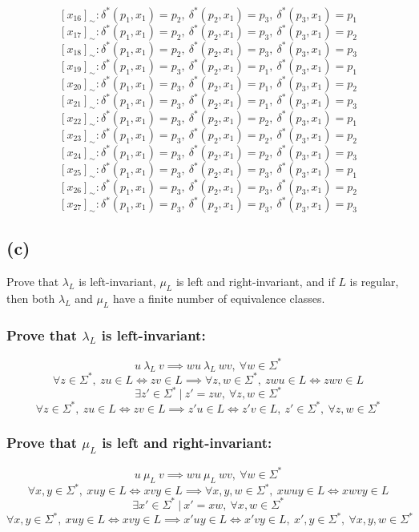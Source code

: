 \documentclass[12pt]{article}
\begin{document}
$$[x_{16}]_{\sim} : \delta^*(p_1, x_1) = p_2,\ \delta^*(p_2, x_1) = p_3,\ \delta^*(p_3, x_1) = p_1$$
$$[x_{17}]_{\sim} : \delta^*(p_1, x_1) = p_2,\ \delta^*(p_2, x_1) = p_3,\ \delta^*(p_3, x_1) = p_2$$
$$[x_{18}]_{\sim} : \delta^*(p_1, x_1) = p_2,\ \delta^*(p_2, x_1) = p_3,\ \delta^*(p_3, x_1) = p_3$$
$$[x_{19}]_{\sim} : \delta^*(p_1, x_1) = p_3,\ \delta^*(p_2, x_1) = p_1,\ \delta^*(p_3, x_1) = p_1$$
$$[x_{20}]_{\sim} : \delta^*(p_1, x_1) = p_3,\ \delta^*(p_2, x_1) = p_1,\ \delta^*(p_3, x_1) = p_2$$
$$[x_{21}]_{\sim} : \delta^*(p_1, x_1) = p_3,\ \delta^*(p_2, x_1) = p_1,\ \delta^*(p_3, x_1) = p_3$$
$$[x_{22}]_{\sim} : \delta^*(p_1, x_1) = p_3,\ \delta^*(p_2, x_1) = p_2,\ \delta^*(p_3, x_1) = p_1$$
$$[x_{23}]_{\sim} : \delta^*(p_1, x_1) = p_3,\ \delta^*(p_2, x_1) = p_2,\ \delta^*(p_3, x_1) = p_2$$
$$[x_{24}]_{\sim} : \delta^*(p_1, x_1) = p_3,\ \delta^*(p_2, x_1) = p_2,\ \delta^*(p_3, x_1) = p_3$$
$$[x_{25}]_{\sim} : \delta^*(p_1, x_1) = p_3,\ \delta^*(p_2, x_1) = p_3,\ \delta^*(p_3, x_1) = p_1$$
$$[x_{26}]_{\sim} : \delta^*(p_1, x_1) = p_3,\ \delta^*(p_2, x_1) = p_3,\ \delta^*(p_3, x_1) = p_2$$
$$[x_{27}]_{\sim} : \delta^*(p_1, x_1) = p_3,\ \delta^*(p_2, x_1) = p_3,\ \delta^*(p_3, x_1) = p_3$$

\newpage
\subsection*{(c)} Prove that $\lambda_L$ is left-invariant, $\mu_L$ is
left and right-invariant, and if $L$ is regular, then both $\lambda_L$ and
$\mu_L$ have a finite number of equivalence classes.

\subsubsection*{Prove that $\lambda_L$ is left-invariant:}
$$u\ \lambda_L\ v \implies wu\ \lambda_L\ wv,\ \forall w \in \Sigma^*$$
$$\forall z \in \Sigma^*,\ zu \in L \iff zv \in L \implies
\forall z,w \in \Sigma^*,\ zwu \in L \iff zwv \in L$$
$$\exists z' \in \Sigma^*\ |\ z'=zw,\ \forall z,w \in \Sigma^*$$
$$\forall z \in \Sigma^*,\ zu \in L \iff zv \in L \implies
z'u \in L \iff z'v \in L,\ z' \in \Sigma^*,\ \forall z,w \in \Sigma^*$$

\subsubsection*{Prove that $\mu_L$ is left and right-invariant:}
$$u\ \mu_L\ v \implies wu\ \mu_L\ wv,\ \forall w \in \Sigma^*$$
$$\forall x,y \in \Sigma^*,\ xuy \in L \iff xvy \in L \implies
\forall x,y,w \in \Sigma^*,\ xwuy \in L \iff xwvy \in L$$
$$\exists x' \in \Sigma^*\ |\ x'=xw,\ \forall x,w \in \Sigma^*$$
$$\forall x,y \in \Sigma^*,\ xuy \in L \iff xvy \in L \implies
x'uy \in L \iff x'vy \in L,\ x',y \in \Sigma^*,\ \forall x,y,w \in \Sigma^*$$
\end{document}
